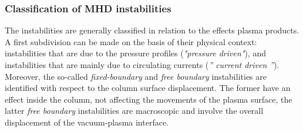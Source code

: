 \subsubsection{Classification of MHD instabilities} 
\label{sez:classificazione}

The instabilities are generally classified in relation to the effects
plasma products. A first subdivision can be made on the basis of their physical context: instabilities that are due to the pressure profiles (\emph{"pressure driven"}), and instabilities that are mainly due to circulating currents (\emph{'' current driven ''}).
%
Moreover, the so-called \emph{fixed-boundary} and \emph{free boundary} instabilities are identified with respect to the column surface displacement. The former have an effect inside the column, not affecting the movements of the plasma surface, the latter \emph{free boundary} instabilities are macroscopic and involve the overall displacement of the vacuum-plasma interface.

